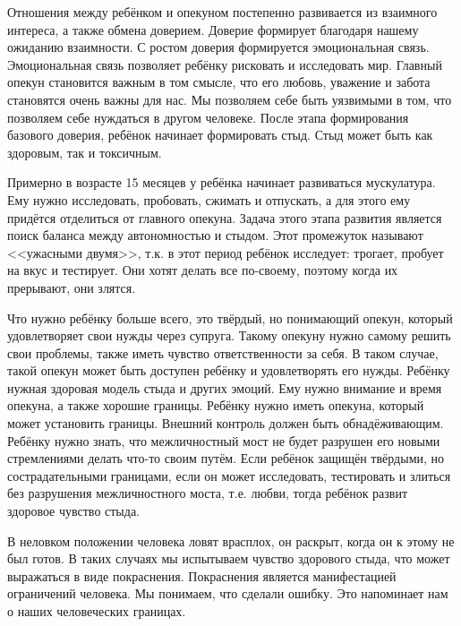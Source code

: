 \documentclass[10pt, fleqn]{article}
\begin{document}

Отношения между ребёнком и опекуном постепенно развивается из взаимного интереса, а также обмена доверием. Доверие формирует благодаря нашему ожиданию взаимности. С ростом доверия формируется эмоциональная связь. Эмоциональная связь позволяет ребёнку рисковать и исследовать мир. Главный опекун становится важным в том смысле, что его любовь, уважение и забота становятся очень важны для нас. Мы позволяем себе быть уязвимыми в том, что позволяем себе нуждаться в другом человеке.
После этапа формирования базового доверия, ребёнок начинает формировать стыд. Стыд может быть как здоровым, так и токсичным.


Примерно в возрасте 15 месяцев у ребёнка начинает развиваться мускулатура. Ему нужно исследовать, пробовать, сжимать и отпускать, а для этого ему придётся отделиться от главного опекуна.
Задача этого этапа развития является поиск баланса между автономностью и стыдом.
Этот промежуток называют <<ужасными двумя>>, т.к. в этот период ребёнок исследует: трогает, пробует на вкус и тестирует. Они хотят делать все по-своему, поэтому когда их прерывают, они злятся.


Что нужно ребёнку больше всего, это твёрдый, но понимающий опекун, который удовлетворяет свои нужды через супруга. Такому опекуну нужно самому решить свои проблемы, также иметь чувство ответственности за себя. В таком случае, такой опекун может быть доступен ребёнку и удовлетворять его нужды.
Ребёнку нужная здоровая модель стыда и других эмоций. Ему нужно внимание и время опекуна, а также хорошие границы. Ребёнку нужно иметь опекуна, который может установить границы. Внешний контроль должен быть обнадёживающим. Ребёнку нужно знать, что межличностный мост не будет разрушен его новыми стремлениями делать что-то своим путём.
Если ребёнок защищён твёрдыми, но сострадательными границами, если он может исследовать, тестировать и злиться без разрушения межличностного моста, т.е. любви, тогда ребёнок развит здоровое чувство стыда.


В неловком положении человека ловят врасплох, он раскрыт, когда он к этому не был готов.
В таких случаях мы испытываем чувство здорового стыда, что может выражаться в виде покраснения.
Покраснения является манифестацией ограничений человека. Мы понимаем, что сделали ошибку. Это напоминает нам о наших человеческих границах.
\end{document}
